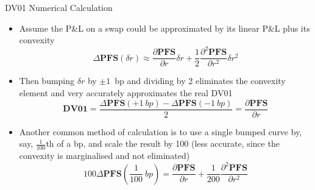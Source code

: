 \documentclass{beamer}
\begin{document}


\begin{frame}{DV01 Numerical Calculation}
\begin{itemize}
	\item<1-> Assume the P\&L on a swap could be approximated by its linear P\&L plus its convexity
	\begin{equation*}
	\Delta \textbf{PFS}(\delta r)\approx \frac{\partial \textbf{PFS} }{\partial r}\delta r + \frac{1}{2}\frac{\partial^2 \textbf{PFS}}{\partial r^2}\delta r^2
	\end{equation*}
	\item<2-> Then bumping $\delta r$ by $\pm 1$~bp and dividing by 2 eliminates the convexity element and very accurately approximates the real DV01
	\begin{equation*}
	\textbf{DV01} = \frac{\Delta \textbf{PFS}(+1~bp)-\Delta \textbf{PFS}(-1~bp)}{2}=\frac{\partial \textbf{PFS} }{\partial r}
	\end{equation*}
	\item<3-> Another common method of calculation is to use a single bumped curve by, say, $\frac{1}{100}$th of a bp, and scale the result by 100 (less accurate, since the convexity is marginalised and not eliminated)
	\begin{equation*}
	100\Delta \textbf{PFS}\left(\frac{1}{100}~bp\right)=\frac{\partial \textbf{PFS}}{\partial r}+\frac{1}{200}\frac{\partial^2\textbf{PFS}}{\partial r^2}
	\end{equation*}
	\end{itemize}
\end{frame}
\end{document}
